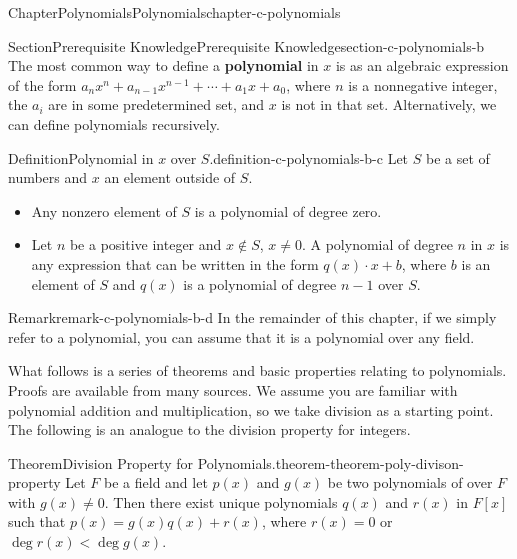 \documentclass[oneside,10pt,]{book}
\newcommand{\terminology}[1]{\textbf{#1}}
\numberwithin{equation}{section}
\begin{document}
\begin{chapterptx}{Chapter}{Polynomials}{}{Polynomials}{}{}{chapter-c-polynomials}
\renewcommand*{\chaptername}{Chapter}
%
%
\typeout{************************************************}
\typeout{************************************************}
%
\begin{sectionptx}{Section}{Prerequisite Knowledge}{}{Prerequisite Knowledge}{}{}{section-c-polynomials-b}
The most common way to define a \terminology{polynomial} in \(x\) is as an algebraic expression of the form \(a_n x^n + a_{n-1}x^{n-1}+ \cdots +a_1 x + a_0\), where \(n\) is a nonnegative integer, the \(a_i\) are in some predetermined set, and \(x\) is not in that set.  Alternatively, we can define polynomials recursively.%
\begin{definition}{Definition}{Polynomial in \(x\) over \(S\).}{definition-c-polynomials-b-c}%
%
Let \(S\) be a set of numbers and \(x\) an element outside of \(S\).%
\begin{itemize}[label=\textbullet]
\item{}Any nonzero element of \(S\) is a polynomial of degree zero.%
\item{}Let \(n\) be a positive integer and \(x \notin S\), \(x \neq 0\).  A polynomial of degree \(n\) in \(x\) is any expression that can be written in the form \(q(x)\cdot x + b\), where \(b\) is an element of \(S\) and \(q(x)\) is a polynomial of degree \(n-1\) over \(S\).%
\end{itemize}
%
\end{definition}
\begin{remark}{Remark}{}{remark-c-polynomials-b-d}%
In the remainder of this chapter, if we simply refer to a polynomial, you can assume that it is a polynomial over any field.%
\end{remark}
What follows is a series of theorems and basic properties relating to polynomials.  Proofs are available from many sources.  We assume you are familiar with polynomial addition and multiplication, so we take division as a starting point.  The following is an analogue to the division property for integers.%
\begin{theorem}{Theorem}{Division Property for Polynomials.}{}{theorem-theorem-poly-divison-property}%
%
Let \(F\) be a field and let \(p(x)\) and \(g(x)\) be two polynomials of over \(F\) with \(g(x) \neq  0\). Then there exist unique polynomials \(q(x)\) and \(r(x)\) in \(F[x]\) such that \(p(x) = g(x) q(x) + r(x)\), where \(r(x) = 0\) or \(\deg  r(x) < \deg  g(x)\).%

\end{theorem}
\end{sectionptx}
\end{chapterptx}
\end{document}

